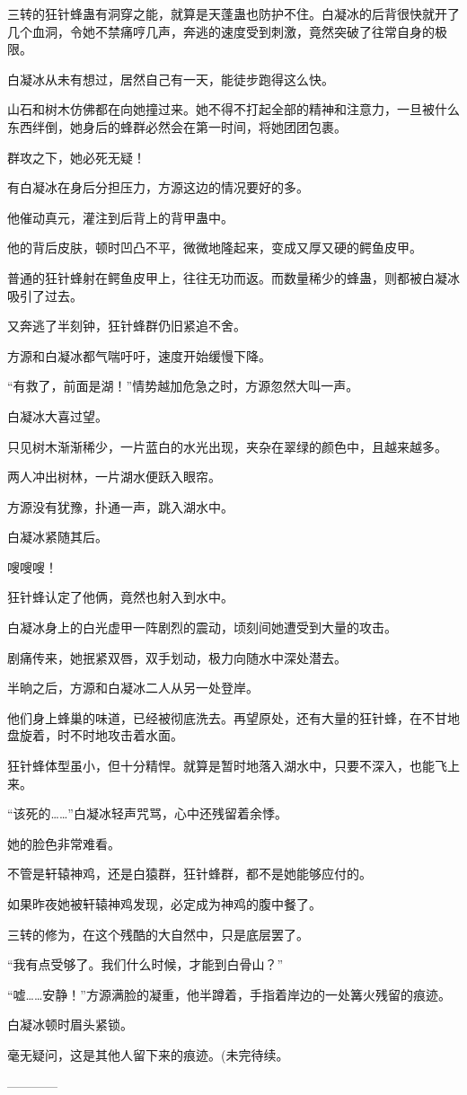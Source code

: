 \begin{this_body}
三转的狂针蜂蛊有洞穿之能，就算是天蓬蛊也防护不住。白凝冰的后背很快就开了几个血洞，令她不禁痛哼几声，奔逃的速度受到刺激，竟然突破了往常自身的极限。

白凝冰从未有想过，居然自己有一天，能徒步跑得这么快。

山石和树木仿佛都在向她撞过来。她不得不打起全部的精神和注意力，一旦被什么东西绊倒，她身后的蜂群必然会在第一时间，将她团团包裹。

群攻之下，她必死无疑！

有白凝冰在身后分担压力，方源这边的情况要好的多。

他催动真元，灌注到后背上的背甲蛊中。

他的背后皮肤，顿时凹凸不平，微微地隆起来，变成又厚又硬的鳄鱼皮甲。

普通的狂针蜂射在鳄鱼皮甲上，往往无功而返。而数量稀少的蜂蛊，则都被白凝冰吸引了过去。

又奔逃了半刻钟，狂针蜂群仍旧紧追不舍。

方源和白凝冰都气喘吁吁，速度开始缓慢下降。

“有救了，前面是湖！”情势越加危急之时，方源忽然大叫一声。

白凝冰大喜过望。

只见树木渐渐稀少，一片蓝白的水光出现，夹杂在翠绿的颜色中，且越来越多。

两人冲出树林，一片湖水便跃入眼帘。

方源没有犹豫，扑通一声，跳入湖水中。

白凝冰紧随其后。

嗖嗖嗖！

狂针蜂认定了他俩，竟然也射入到水中。

白凝冰身上的白光虚甲一阵剧烈的震动，顷刻间她遭受到大量的攻击。

剧痛传来，她抿紧双唇，双手划动，极力向随水中深处潜去。

半晌之后，方源和白凝冰二人从另一处登岸。

他们身上蜂巢的味道，已经被彻底洗去。再望原处，还有大量的狂针蜂，在不甘地盘旋着，时不时地攻击着水面。

狂针蜂体型虽小，但十分精悍。就算是暂时地落入湖水中，只要不深入，也能飞上来。

“该死的……”白凝冰轻声咒骂，心中还残留着余悸。

她的脸色非常难看。

不管是轩辕神鸡，还是白猿群，狂针蜂群，都不是她能够应付的。

如果昨夜她被轩辕神鸡发现，必定成为神鸡的腹中餐了。

三转的修为，在这个残酷的大自然中，只是底层罢了。

“我有点受够了。我们什么时候，才能到白骨山？”

“嘘……安静！”方源满脸的凝重，他半蹲着，手指着岸边的一处篝火残留的痕迹。

白凝冰顿时眉头紧锁。

毫无疑问，这是其他人留下来的痕迹。(未完待续。

------------

\end{this_body}


